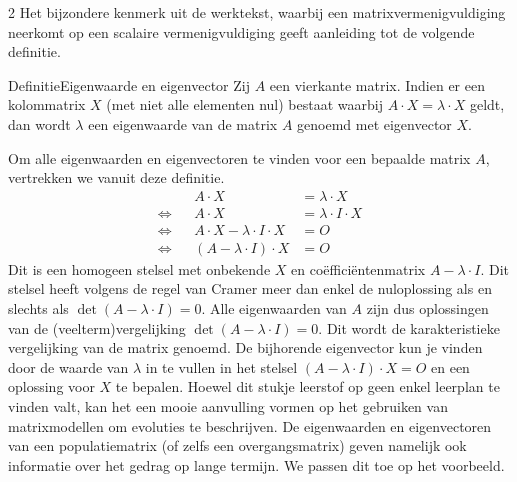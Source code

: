\begin{multicols}{2}
Het bijzondere kenmerk uit de werktekst, waarbij een matrixvermenigvuldiging neerkomt op een scalaire vermenigvuldiging geeft aanleiding tot de volgende definitie.
\begin{kader}{Definitie}{Eigenwaarde en eigenvector}
Zij $A$ een vierkante matrix. Indien er een kolommatrix $X$ (met niet alle elementen nul) bestaat waarbij $A\cdot X = \lambda \cdot X$ geldt, dan wordt $\lambda$ een eigenwaarde van de matrix $A$ genoemd met eigenvector $X$. 
\end{kader}

Om alle eigenwaarden en eigenvectoren te vinden voor een bepaalde matrix $A$, vertrekken we vanuit deze definitie. 
\begin{align*}
    & & A \cdot X & = \lambda \cdot X \\
    \Leftrightarrow & & A \cdot X & = \lambda \cdot I \cdot X \\
    \Leftrightarrow & & A \cdot X - \lambda \cdot I \cdot X & = O \\
    \Leftrightarrow & & (A - \lambda \cdot I) \cdot X & = O    
\end{align*} 
Dit is een homogeen stelsel met onbekende $X$ en co\"effici\"entenmatrix $A-\lambda\cdot I$. Dit stelsel heeft volgens de regel van Cramer meer dan enkel de nuloplossing als en slechts als $\det ( A-\lambda\cdot I) = 0$. Alle eigenwaarden van $A$ zijn dus oplossingen van de (veelterm)vergelijking $\det ( A-\lambda\cdot I) = 0$. Dit wordt de karakteristieke vergelijking van de matrix genoemd. De bijhorende eigenvector kun je vinden door de waarde van $\lambda$ in te vullen in het stelsel $(A-\lambda\cdot I)\cdot X=O$ en een oplossing voor $X$ te bepalen. 
Hoewel dit stukje leerstof op geen enkel leerplan te vinden valt, kan het een mooie aanvulling vormen op het gebruiken van matrixmodellen om evoluties te beschrijven. De eigenwaarden en eigenvectoren van een populatiematrix (of zelfs een overgangsmatrix) geven namelijk ook informatie over het gedrag op lange termijn. We passen dit toe op het voorbeeld.

\end{multicols}


